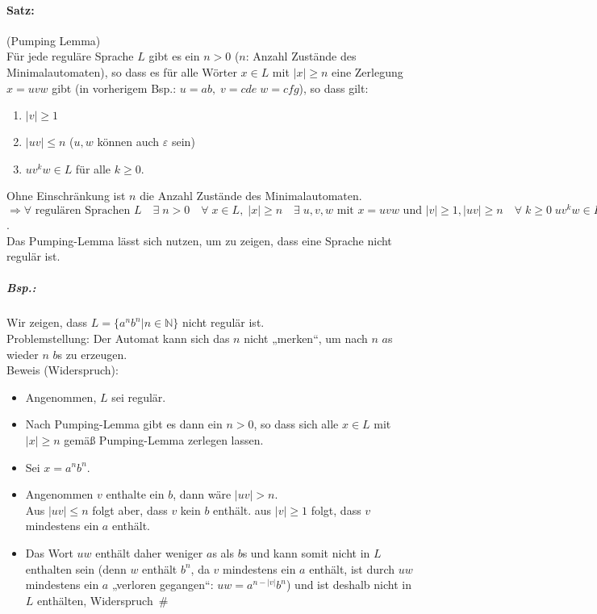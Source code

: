 \documentclass{scrreprt}
\begin{document}
\paragraph{Satz:} (Pumping Lemma)\\
Für jede reguläre Sprache $L$ gibt es ein $n>0$ ($n$: Anzahl Zustände des Minimalautomaten), so dass es für alle Wörter $x \in L$ mit $|x|\geq n$ eine Zerlegung $x=uvw$ gibt (in vorherigem Bsp.: $u=ab, \; v=cde \; w =cfg$), so dass gilt:
\begin{enumerate}
\item $|v| \geq 1$
\item $|uv|\leq n$ \quad ($u, w$ können auch $\varepsilon$ sein)
\item $uv^kw \in L$ für alle $k\geq 0$.
\end{enumerate}
Ohne Einschränkung ist $n$ die Anzahl Zustände des Minimalautomaten.\\
$\Rightarrow \forall \text{ regulären Sprachen }L\quad \exists \;n>0 \quad\forall \; x \in L, \; |x| \geq n \quad \exists \;u,v,w \text{ mit }x=uvw \text{ und }|v| \geq 1,|uv|\geq n \quad \forall \; k\geq 0 \; uv^kw\in L$.\\
Das Pumping-Lemma lässt sich nutzen, um zu zeigen, dass eine Sprache nicht regulär ist.
\subparagraph{Bsp.:} Wir zeigen, dass $L=\{a^nb^n|n\in \mathbb{N}\}$ nicht regulär ist.\\
Problemstellung: Der Automat kann sich das $n$ nicht „merken“, um nach $n$ $a$s wieder $n$ $b$s zu erzeugen. \\
Beweis (Widerspruch):
\begin{itemize}
\item Angenommen, $L$ sei regulär.
\item Nach Pumping-Lemma gibt es dann ein $n>0$, so dass sich alle $x\in L$ mit $|x|\geq n$ gemäß Pumping-Lemma zerlegen lassen.
\item Sei $x=a^nb^n$. 
\item Angenommen $v$ enthalte ein $b$, dann wäre $|uv| > n$. \\
Aus $|uv|\leq n$ folgt aber, dass $v$ kein $b$ enthält. aus $|v|\geq 1$ folgt, dass $v$ mindestens ein $a$ enthält.\\
\item Das Wort $uw$ enthält daher weniger $a$s als $b$s und kann somit nicht in $L$ enthalten sein (denn $w$ enthält $b^n$, da $v$ mindestens ein $a$ enthält, ist durch $uw$ mindestens ein $a$ „verloren gegangen“: $uw=a^{n-|v|}b^n$) und ist deshalb nicht in $L$ enthälten, Widerspruch\,\lightning \; \#
\end{itemize}
\end{document}
